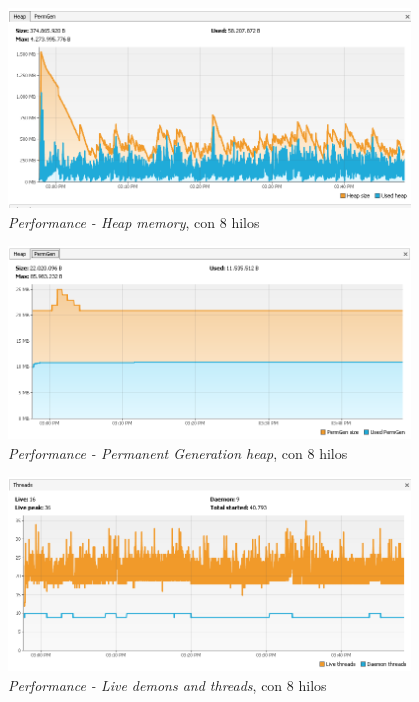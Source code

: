 \begin{figure}[H]
\centering
\includegraphics[width=0.95\textwidth]{images/Performance_HEAP_8_Threads}
\caption{\emph{Performance - Heap memory}, con 8 hilos}
\label{fig:6.14}
\end{figure}

\begin{figure}[H]
\centering
\includegraphics[width=0.95\textwidth]{images/Performance_PERM_8_Threads}
\caption{\emph{Performance - Permanent Generation heap}, con 8 hilos}
\label{fig:6.15}
\end{figure}

\begin{figure}[H]
\centering
\includegraphics[width=0.95\textwidth]{images/Performance_LIVE_8_Threads}
\caption{\emph{Performance - Live demons and threads}, con 8 hilos}
\label{fig:6.16}
\end{figure}

